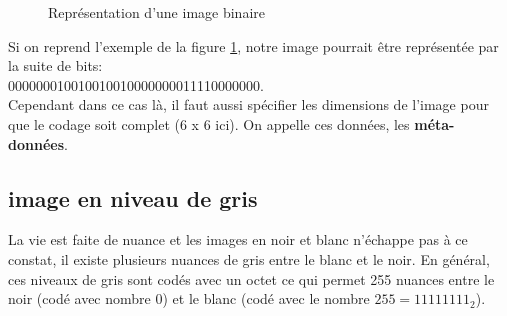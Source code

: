 \begin{figure}[h!]
	\centering
	\hspace{1cm}
	\hspace{1cm}
	\caption{Représentation d'une image binaire}
	\label{img_bin}
\end{figure}
Si on reprend l'exemple de la figure \ref{img_bin}, notre image pourrait être représentée par la suite de bits:\\
\hspace{1cm} 000000010010010010000000011110000000.\\
Cependant dans ce cas là, il faut aussi spécifier les dimensions de l'image pour que le codage soit complet (6 x 6 ici). On appelle ces données, les \textbf{méta-données}.
	
\subsection{image en niveau de gris}
La vie est faite de nuance et les images en noir et blanc n'échappe pas à ce constat, il existe plusieurs nuances de gris entre le blanc et le noir. En général, ces niveaux de gris sont codés avec un octet ce qui permet 255 nuances entre le noir (codé avec nombre 0) et le blanc (codé avec le nombre $255=11111111_2$).

